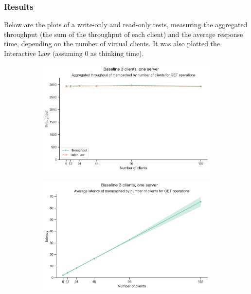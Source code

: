 \documentclass[11pt,a4paper]{article}
\begin{document}
\subsubsection{Results}

Below are the plots of a write-only and read-only tests, measuring the aggregated throughput (the sum of the throughput of each client) and the average response time,  depending on the number of virtual clients.
It was also plotted the Interactive Law (assuming 0 as thinking time).

\begin{figure}[H]
	\begin{subfigure}[b]{0.5\linewidth}
		\includegraphics[width=\linewidth]{images/baseline_1/last_graph_get_throughput.pdf}
	\end{subfigure}
	\begin{subfigure}[b]{0.5\linewidth}
		\includegraphics[width=\linewidth]{images/baseline_1/last_graph_get_latency.pdf}

\end{subfigure}
\end{figure}
\end{document}
